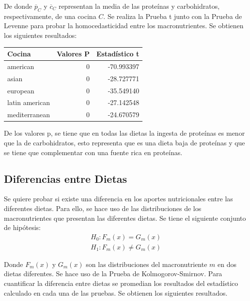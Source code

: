\documentclass[12pt,a4paper]{article}
\begin{document}
{{            De donde $\overline{p}_C$ y $\overline{c}_C$ representan la media 
            de las proteínas y carbohidratos, respectivamente, de una cocina $C$. 
            Se realiza la Prueba t junto con la Prueba de Levenne para 
            probar la homocedasticidad entre los macronutrientes. Se obtienen 
            los siguientes resultados:

            \begin{center}
                \begin{tabular}{lrr}
                \toprule
                    Cocina & Valores P & Estadístico t \\
                \midrule
                    american       & 0 & -70.993397 \\
                    asian          & 0 & -28.727771 \\
                    european       & 0 & -35.549140 \\
                    latin american & 0 & -27.142548 \\
                    mediterranean  & 0 & -24.670579 \\
                \bottomrule
                \end{tabular}
            \end{center}

            De los valores p, se tiene que en todas las dietas la ingesta de 
            proteínas es menor que la de carbohidratos, esto representa que 
            es una dieta baja de proteínas y que se tiene que complementar 
            con una fuente rica en proteínas.
        }

        \subsection{Diferencias entre Dietas}
        {
            Se quiere probar si
            existe una diferencia en los aportes nutricionales entre las diferentes 
            dietas. Para ello, se hace uso de las distribuciones de los macronutrientes 
            que presentan las diferentes dietas. Se tiene el siguiente conjunto de  
            hipótesis:
            \begin{align*}
                H_0 : F_m(x) = G_m(x) \\
                H_1 : F_m(x) \ne G_m(x)
            \end{align*}

            Donde $F_m(x)$ y $G_m(x)$ son las distribuciones del macronutriente $m$ en 
            dos dietas diferentes. Se hace uso de la Prueba de Kolmogorov-Smirnov. Para 
            cuantificar la diferencia entre dietas 
            se promedian los resultados del estadístico calculado en cada una de las pruebas.
            Se obtienen los siguientes resultados.

}}
\end{document}
